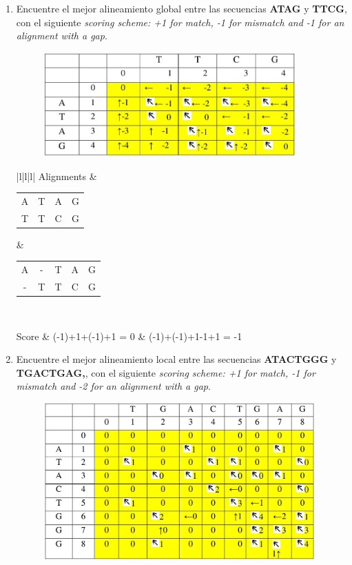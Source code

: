 \documentclass{article}
\begin{document}
\begin{enumerate}
		\item 
		Encuentre el mejor alineamiento global entre las secuencias \textbf{ATAG} y \textbf{TTCG}, con el siguiente \textit{scoring scheme: +1 for match, -1 for mismatch and -1 for an alignment with a gap}.
		
		\begin{figure}[hbt!]
			\centering
			\includegraphics[height=4cm,keepaspectratio]{img/prac5_2}	
		\end{figure}
		
		\begin{table}[hbt!]
			\centering
			
			\begin{tabular}{|l|l|l|}
				\hline
				Alignments &  
				\begin{tabular}{cccc} 
					A & T & A & G \\  
					T & T & C & G
				\end{tabular}  & 
				
				\begin{tabular}{ccccc} 
					A & - & T & A & G \\  
					- & T & T & C & G
				\end{tabular}  \\ \hline
				
				Score      & (-1)+1+(-1)+1 = 0 & (-1)+(-1)+1-1+1 = -1  \\ \hline
			          
			\end{tabular}
		\end{table}
		
		
		\clearpage
		\item 
		Encuentre el mejor alineamiento local entre las secuencias \textbf{ATACTGGG} y \textbf{TGACTGAG,}, con el siguiente \textit{scoring scheme: +1 for match, -1 for mismatch and -2 for an alignment with a gap}.
		
		\begin{figure}[hbt!]
			\centering
			\includegraphics[height=6cm,keepaspectratio]{img/prac5_3}	
		\end{figure}
		

\end{enumerate}
\end{document}
